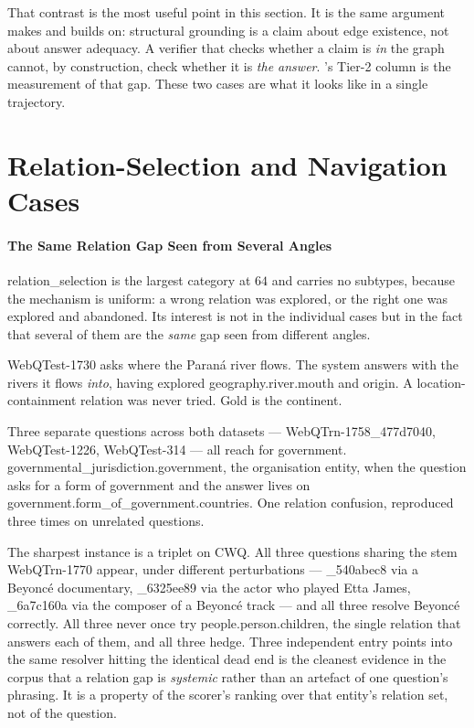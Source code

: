 That contrast is the most useful point in this section. It is the same
argument  makes and  builds
on: structural grounding is a claim about edge existence, not about answer
adequacy. A verifier that checks whether a claim is \emph{in} the graph cannot,
by construction, check whether it is \emph{the answer}.
's Tier-2 column is the measurement of that gap. These
two cases are what it looks like in a single trajectory.


\section{Relation-Selection and Navigation Cases}\label{app:relation-cases}

\paragraph{The Same Relation Gap Seen from Several Angles}

\textsf{relation\_selection} is the largest category at $64$ and carries no
subtypes, because the mechanism is uniform: a wrong relation was explored, or
the right one was explored and abandoned. Its interest is not in the individual
cases but in the fact that several of them are the \emph{same} gap seen from
different angles.

\textsf{WebQTest-1730} asks where the Paraná river flows. The system answers
with the rivers it flows \emph{into}, having explored
\textsf{geography.river.mouth} and \textsf{origin}. A location-containment
relation was never tried. Gold is the continent.

Three separate questions across both datasets ---
\textsf{WebQTrn-1758\_477d7040}, \textsf{WebQTest-1226}, \textsf{WebQTest-314}
--- all reach for \textsf{government.\allowbreak
governmental\_jurisdiction.\allowbreak government}, the organisation entity,
when the question asks for a form of government and the answer lives on
\textsf{government.\allowbreak form\_of\_government.\allowbreak countries}. One
relation confusion, reproduced three times on unrelated questions.

The sharpest instance is a triplet on CWQ. All three questions sharing the stem
\textsf{WebQTrn-1770} appear, under different perturbations ---
\textsf{\_540abec8} via a Beyoncé documentary, \textsf{\_6325ee89} via the actor
who played Etta James, \textsf{\_6a7c160a} via the composer of a Beyoncé track
--- and all three resolve Beyoncé correctly. All three never once try
\textsf{people.person.children}, the single relation that answers each of them,
and all three hedge. Three independent entry points into the same resolver
hitting the identical dead end is the cleanest evidence in the corpus that a
relation gap is \emph{systemic} rather than an artefact of one question's
phrasing. It is a property of the scorer's ranking over that entity's relation
set, not of the question.

